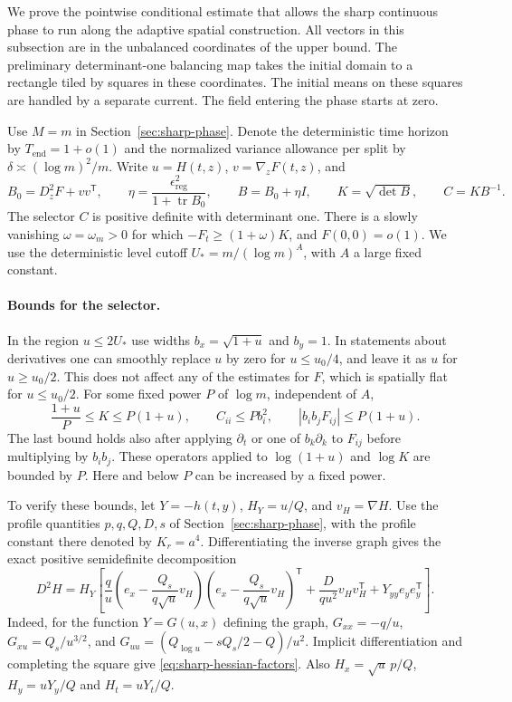 \documentclass[11pt]{article}
\newcommand{\1}{\mathbf{1}}
\numberwithin{equation}{section}
\newcommand{\tr}{\operatorname{tr}}
\begin{document}
We prove the pointwise conditional estimate that allows the sharp
continuous phase to run along the adaptive spatial construction.
All vectors in this subsection are in the unbalanced coordinates
of the upper bound. The preliminary determinant-one balancing map
takes the initial domain to a rectangle tiled by squares in these
coordinates. The initial means on these squares are handled by a
separate current. The field entering the phase starts at zero.

Use \(M=m\) in Section~\ref{sec:sharp-phase}. Denote the deterministic
time horizon by \(T_{\mathrm{end}}=1+o(1)\) and the normalized
variance allowance per split by \(\delta\asymp(\log m)^2/m\).
Write \(u=H(t,z)\), \(v=\nabla_z F(t,z)\), and
\[
 B_0=D_z^2F+vv^{\mathsf T},\qquad
 \eta=\frac{\epsilon_{\mathrm{reg}}^2}{1+\tr B_0},\qquad
 B=B_0+\eta I,\qquad K=\sqrt{\det B},\qquad C=KB^{-1}.
\]
The selector \(C\) is positive definite with determinant one.
There is a slowly vanishing \(\omega=\omega_m>0\) for which
\(-F_t\ge(1+\omega)K\), and \(F(0,0)=o(1)\). We use the deterministic
level cutoff \(U_*=m/(\log m)^A\), with \(A\) a large fixed constant.

\paragraph{Bounds for the selector.}
In the region \(u\le 2U_*\) use widths \(b_x=\sqrt{1+u}\) and
\(b_y=1\). In statements about derivatives one can smoothly
replace \(u\) by zero for \(u\le u_0/4\), and leave it as \(u\) for
\(u\ge u_0/2\). This does not affect any of the estimates for \(F\),
which is spatially flat for \(u\le u_0/2\).
For some fixed power \(P\) of \(\log m\), independent of \(A\),
\begin{equation}\label{eq:sharp-width-derivatives}
 \frac{1+u}{P}\le K\le P(1+u),\qquad
 C_{ii}\le P b_i^2,\qquad
 |b_i b_j F_{ij}|\le P(1+u).
\end{equation}
The last bound holds also after applying \(\partial_t\) or one
of \(b_k\partial_k\) to \(F_{ij}\) before multiplying by
\(b_i b_j\). These operators applied to
\(\log(1+u)\) and \(\log K\) are bounded by \(P\).
Here and below \(P\) can be increased by a fixed power.

To verify these bounds, let \(Y=-h(t,y)\), \(H_Y=u/Q\),
and \(v_H=\nabla H\). Use the profile quantities \(p,q,Q,D,s\)
of Section~\ref{sec:sharp-phase}, with the profile constant
there denoted by \(K_r=a^4\). Differentiating the inverse graph
gives the exact positive semidefinite decomposition
\begin{equation}\label{eq:sharp-hessian-factors}
 D^2H=H_Y\left[
 \frac q u\left(e_x-\frac{Q_s}{q\sqrt u}v_H\right)
             \left(e_x-\frac{Q_s}{q\sqrt u}v_H\right)^{\mathsf T}
 +\frac{D}{q u^2}v_Hv_H^{\mathsf T}+Y_{yy}e_ye_y^{\mathsf T}\right].
\end{equation}
Indeed, for the function \(Y=G(u,x)\) defining the graph,
\(G_{xx}=-q/u\), \(G_{xu}=Q_s/u^{3/2}\), and
\(G_{uu}=(Q_{\log u}-sQ_s/2-Q)/u^2\). Implicit differentiation
and completing the square give \eqref{eq:sharp-hessian-factors}.
Also \(H_x=\sqrt{u}\,p/Q\), \(H_y=uY_y/Q\) and \(H_t=uY_t/Q\).
\end{document}
